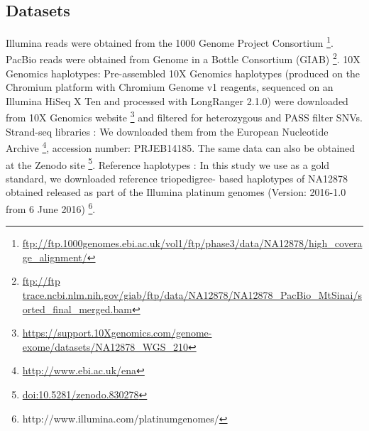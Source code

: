 \subsection{Datasets} 
Illumina reads \citep{sudmant2015integrated, 10002015global} were obtained from the 1000 Genome Project Consortium \footnote{\url{ftp://ftp.1000genomes.ebi.ac.uk/vol1/ftp/phase3/data/NA12878/high_coverage_alignment/}}. 
PacBio reads \citep{giab} were obtained from Genome in a Bottle Consortium (GIAB) \footnote{\url{ftp://ftp trace.ncbi.nlm.nih.gov/giab/ftp/data/NA12878/NA12878_PacBio_MtSinai/sorted_final_merged.bam}}. 
10X Genomics haplotypes: Pre-assembled 10X Genomics haplotypes (produced on the Chromium platform with Chromium Genome v1 reagents, sequenced on an Illumina HiSeq X Ten and processed with LongRanger 2.1.0) were downloaded from 
10X Genomics website \footnote{\url{https://support.10Xgenomics.com/genome-exome/datasets/NA12878_WGS_210}} and filtered for heterozygous and PASS filter SNVs. 
Strand-seq libraries \citep{Porubsky2016}: We downloaded them from the European Nucleotide Archive \footnote{\url{http://www.ebi.ac.uk/ena}}, accession number: PRJEB14185. 
The same data can also be obtained at the Zenodo site \footnote{\url{doi:10.5281/zenodo.830278}}. 
Reference haplotypes \citep{eberle2017reference}: In this study we use as a gold standard, we downloaded reference triopedigree- based haplotypes of NA12878 obtained released as part of the Illumina platinum genomes (Version: 2016-1.0 from 6 June 2016) \footnote{http://www.illumina.com/platinumgenomes/}.

